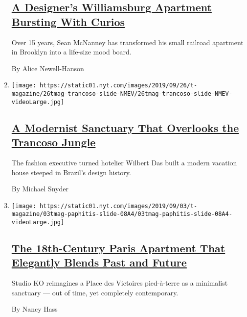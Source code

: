 \begin{enumerate}
  \hypertarget{a-designers-williamsburg-apartment-bursting-with-curios}{%
  \subsection{\texorpdfstring{\href{/2019/10/18/t-magazine/sean-mcnanney.html}{A
  Designer's Williamsburg Apartment Bursting With
  Curios}}{A Designer's Williamsburg Apartment Bursting With Curios}}\label{a-designers-williamsburg-apartment-bursting-with-curios}}

  Over 15 years, Sean McNanney has transformed his small railroad
  apartment in Brooklyn into a life-size mood board.

  By Alice Newell-Hanson
\item
  \texttt{[image: https://static01.nyt.com/images/2019/09/26/t-magazine/26tmag-trancoso-slide-NMEV/26tmag-trancoso-slide-NMEV-videoLarge.jpg]}

  \hypertarget{a-modernist-sanctuary-that-overlooks-the-trancoso-jungle}{%
  \subsection{\texorpdfstring{\href{/2019/09/26/t-magazine/trancoso-brazil-house.html}{A
  Modernist Sanctuary That Overlooks the Trancoso
  Jungle}}{A Modernist Sanctuary That Overlooks the Trancoso Jungle}}\label{a-modernist-sanctuary-that-overlooks-the-trancoso-jungle}}

  The fashion executive turned hotelier Wilbert Das built a modern
  vacation house steeped in Brazil's design history.

  By Michael Snyder
\item
  \texttt{[image: https://static01.nyt.com/images/2019/09/03/t-magazine/03tmag-paphitis-slide-08A4/03tmag-paphitis-slide-08A4-videoLarge.jpg]}

  \hypertarget{the-18th-century-paris-apartment-that-elegantly-blends-past-and-future}{%
  \subsection{\texorpdfstring{\href{/2019/09/03/t-magazine/place-des-victoires-paris-apartment.html}{The
  18th-Century Paris Apartment That Elegantly Blends Past and
  Future}}{The 18th-Century Paris Apartment That Elegantly Blends Past and Future}}\label{the-18th-century-paris-apartment-that-elegantly-blends-past-and-future}}

  Studio KO reimagines a Place des Victoires pied-à-terre as a
  minimalist sanctuary --- out of time, yet completely contemporary.

  By Nancy Hass
\end{enumerate}

